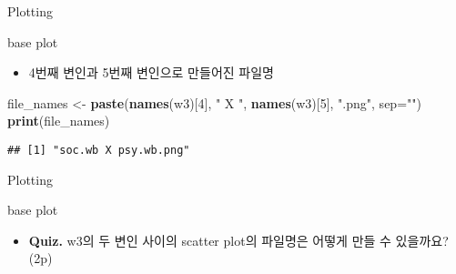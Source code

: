 \documentclass[ignorenonframetext,]{beamer}
\newenvironment{Shaded}{\begin{snugshade}}{\end{snugshade}}
\newcommand{\KeywordTok}[1]{\textcolor[rgb]{0.13,0.29,0.53}{\textbf{#1}}}
\newcommand{\DataTypeTok}[1]{\textcolor[rgb]{0.13,0.29,0.53}{#1}}
\newcommand{\DecValTok}[1]{\textcolor[rgb]{0.00,0.00,0.81}{#1}}
\newcommand{\StringTok}[1]{\textcolor[rgb]{0.31,0.60,0.02}{#1}}
\newcommand{\NormalTok}[1]{#1}
\providecommand{\tightlist}{%
  \setlength{\itemsep}{0pt}\setlength{\parskip}{0pt}}
\begin{document}
\begin{frame}[fragile]{Plotting}

\begin{block}{base plot}

\begin{itemize}
\tightlist
\item
  4번째 변인과 5번째 변인으로 만들어진 파일명
\end{itemize}

\begin{Shaded}
\begin{Highlighting}[]
\NormalTok{file_names <-}\StringTok{ }\KeywordTok{paste}\NormalTok{(}\KeywordTok{names}\NormalTok{(w3)[}\DecValTok{4}\NormalTok{], }\StringTok{" X "}\NormalTok{, }\KeywordTok{names}\NormalTok{(w3)[}\DecValTok{5}\NormalTok{], }\StringTok{".png"}\NormalTok{, }\DataTypeTok{sep=}\StringTok{""}\NormalTok{)}
\KeywordTok{print}\NormalTok{(file_names)}
\end{Highlighting}
\end{Shaded}

\begin{verbatim}
## [1] "soc.wb X psy.wb.png"
\end{verbatim}

\end{block}

\end{frame}

\begin{frame}{Plotting}

\begin{block}{base plot}

\begin{itemize}
\tightlist
\item
  \textbf{Quiz.} w3의 두 변인 사이의 scatter plot의 파일명은 어떻게 만들
  수 있을까요? (2p)
\end{itemize}

\end{block}

\end{frame}
\end{document}
